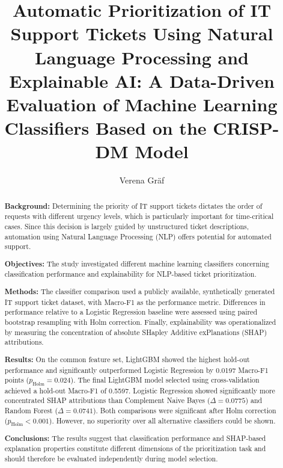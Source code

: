 \documentclass[manuscript, screen, review]{jair}
\begin{document}
\title[Automatic Prioritization of IT Support Tickets]
{Automatic Prioritization of IT Support Tickets Using Natural Language Processing and Explainable AI: A Data-Driven Evaluation of Machine Learning Classifiers Based on the CRISP-DM Model}

\author{Verena Gräf}



\renewcommand{\shortauthors}{Gräf}

\begin{abstract}
{\bf Background:}
Determining the priority of IT support tickets dictates the order of requests with different urgency levels, which is particularly important for time-critical cases. Since this decision is largely guided by unstructured
ticket descriptions, automation using Natural Language Processing (NLP) offers potential for automated support.

{\bf Objectives:}
The study investigated different machine learning classifiers concerning classification performance and explainability for NLP-based ticket prioritization.


{\bf Methods:}
The classifier comparison used a publicly available, synthetically generated IT support ticket dataset, with Macro-F1 as the performance metric. Differences in performance relative to a Logistic Regression baseline were assessed using paired bootstrap resampling with Holm correction. Finally, explainability was
operationalized by measuring the concentration of absolute SHapley Additive exPlanations (SHAP) attributions.

{\bf Results:}
On the common feature set, LightGBM showed the highest hold-out performance and significantly outperformed Logistic Regression by 0.0197 Macro-F1 points ($p_{\mathrm{Holm}} = 0.024$). The final LightGBM model selected using cross-validation achieved a hold-out Macro-F1 of 0.5597. Logistic Regression showed significantly more concentrated SHAP attributions than Complement Naive Bayes ($\Delta = 0.0775$) and Random Forest ($\Delta = 0.0741$). Both comparisons were significant after Holm correction
($p_{\mathrm{Holm}} < 0.001$). However, no superiority over all alternative classifiers could be shown.

{\bf Conclusions:}
The results suggest that classification performance and SHAP-based explanation properties constitute different dimensions of the prioritization task and should therefore be evaluated independently during model selection.

\end{abstract}
\end{document}
